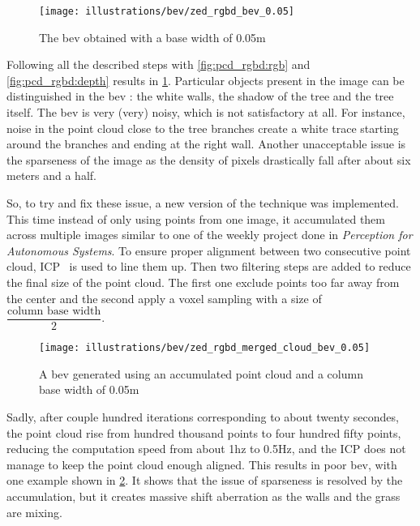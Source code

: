 \begin{figure}[ht!]
    \centering
    \texttt{[image: illustrations/bev/zed\_rgbd\_bev\_0.05]}
    \caption{The \gls{bev} obtained with a base width of 0.05m}
    \label{fig:pcd_rgbd:bev_0.05}
\end{figure}

Following all the described steps with \cref{fig:pcd_rgbd:rgb} and \cref{fig:pcd_rgbd:depth} results in \cref{fig:pcd_rgbd:bev_0.05}.
Particular objects present in the image can be distinguished in the bev : the white walls, the shadow of the tree and the tree itself.
The \gls{bev} is very (very) noisy, which is not satisfactory at all.
For instance, noise in the point cloud close to the tree branches create a white trace starting around the branches and ending at the right wall.
Another unacceptable issue is the sparseness of the image as the density of pixels drastically fall after about six meters and a half.

So, to try and fix these issue, a new version of the technique was implemented.
This time instead of only using points from one image, it accumulated them across multiple images similar to one of the weekly project
done in \textit{Perception for Autonomous Systems}. %
To ensure proper alignment between two consecutive point cloud, ICP~\parencite{besl_method_1992} is used to line them up.
Then two filtering steps are added to reduce the final size of the point cloud.
The first one exclude points too far away from the center and the second apply a voxel sampling with a size of $\dfrac{\text{column base width}}{2}$.

\begin{figure}[ht!]
    \centering
    \texttt{[image: illustrations/bev/zed\_rgbd\_merged\_cloud\_bev\_0.05]} %
    \caption{A \gls{bev} generated using an accumulated point cloud and a column base width of 0.05m}
    \label{fig:pcd_rgbd:accumulated_bev_0.05}
\end{figure}

Sadly, after couple hundred iterations corresponding to about twenty secondes, the point cloud rise from hundred
thousand points to four hundred fifty points, reducing the computation speed from about 1hz to 0.5Hz, and the ICP does not
manage to keep the point cloud enough aligned.
This results in poor \gls{bev}, with one example shown in \cref{fig:pcd_rgbd:accumulated_bev_0.05}.
It shows that the issue of sparseness is resolved by the accumulation, but it creates massive shift aberration as the walls and
the grass are mixing.

